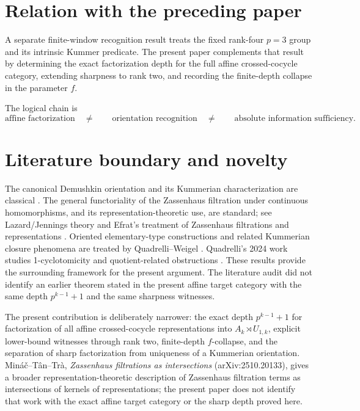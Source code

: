 \documentclass[11pt]{article}
\begin{document}
\section{Relation with the preceding paper}
A separate finite-window recognition result treats the fixed rank-four $p=3$ group and its intrinsic Kummer predicate. The present paper complements that result by determining the exact factorization depth for the full affine crossed-cocycle category, extending sharpness to rank two, and recording the finite-depth collapse in the parameter $f$.

The logical chain is
\[
\text{affine factorization}
\quad\ne\quad
\quad\text{orientation recognition}
\quad\ne\quad
\quad\text{absolute information sufficiency}.
\]

\section{Literature boundary and novelty}
The canonical Demushkin orientation and its Kummerian characterization are classical \cite{Labute1967,EfratQuadrelli2019}. The general functoriality of the Zassenhaus filtration under continuous homomorphisms, and its representation-theoretic use, are standard; see Lazard/Jennings theory and Efrat's treatment of Zassenhaus filtrations and representations \cite{Efrat2014,MinacRogelstadTan2016}. Oriented elementary-type constructions and related Kummerian closure phenomena are treated by Quadrelli--Weigel \cite{QuadrelliWeigel2022}. Quadrelli's 2024 work studies 1-cyclotomicity and quotient-related obstructions \cite{Quadrelli2024}. These results provide the surrounding framework for the present argument. The literature audit did not identify an earlier theorem stated in the present affine target category with the same depth $p^{k-1}+1$ and the same sharpness witnesses.

The present contribution is deliberately narrower: the exact depth $p^{k-1}+1$ for factorization of all affine crossed-cocycle representations into $A_k\rtimes U_{1,k}$, explicit lower-bound witnesses through rank two, finite-depth $f$-collapse, and the separation of sharp factorization from uniqueness of a Kummerian orientation. Mináč--Tân--Trà, \emph{Zassenhaus filtrations as intersections} (arXiv:2510.20133), gives a broader representation-theoretic description of Zassenhaus filtration terms as intersections of kernels of representations; the present paper does not identify that work with the exact affine target category or the sharp depth proved here.
\end{document}
